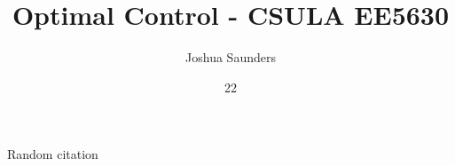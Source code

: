 \documentclass[english, course]{Notes}
\title{Optimal Control - CSULA EE5630}
\author{Joshua Saunders}
\date{22}{1}{2018}
\begin{document}
Random citation \cite{kirkdover}



\end{document}
